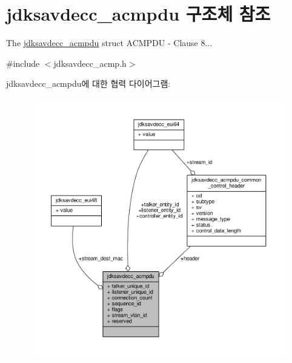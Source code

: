 \hypertarget{structjdksavdecc__acmpdu}{}\section{jdksavdecc\+\_\+acmpdu 구조체 참조}
\label{structjdksavdecc__acmpdu}


The \hyperlink{structjdksavdecc__acmpdu}{jdksavdecc\+\_\+acmpdu} struct A\+C\+M\+P\+DU -\/ Clause 8...  




{\ttfamily \#include $<$jdksavdecc\+\_\+acmp.\+h$>$}



jdksavdecc\+\_\+acmpdu에 대한 협력 다이어그램\+:
\nopagebreak
\begin{figure}[H]
\begin{center}
\leavevmode
\includegraphics[width=350pt]{structjdksavdecc__acmpdu__coll__graph}
\end{center}
\end{figure}
